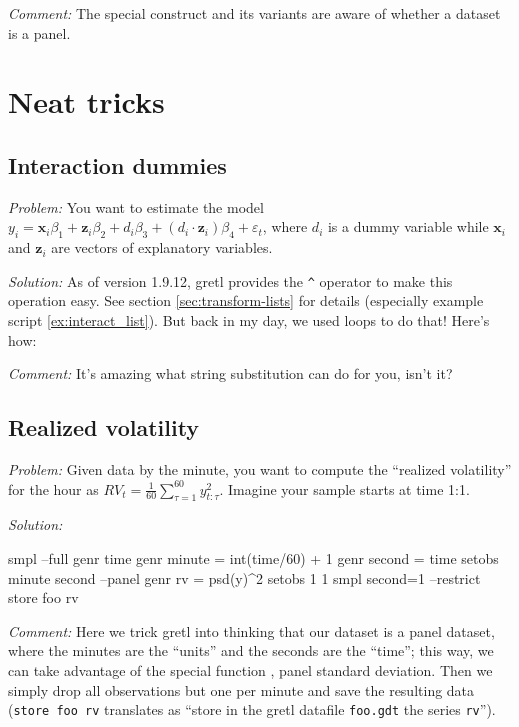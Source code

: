 \emph{Comment:} The special construct  and its variants
are aware of whether a dataset is a panel.

\section{Neat tricks}
\label{sec:cheat-neat}

\subsection{Interaction dummies}

\emph{Problem:} You want to estimate the model $y_i = \mathbf{x}_i
\beta_1 + \mathbf{z}_i \beta_2 + d_i \beta_3 + (d_i \cdot \mathbf{z}_i)
\beta_4 + \varepsilon_t$, where $d_i$ is a dummy variable while
$\mathbf{x}_i$ and $\mathbf{z}_i$ are vectors of explanatory
variables.

\emph{Solution:} As of version 1.9.12, gretl provides the
\verb|^| operator to make this operation easy. See section
\ref{sec:transform-lists} for details (especially example script
\ref{ex:interact_list}). But back in my day, we used loops to do that!
Here's how:


\emph{Comment:} It's amazing what string substitution can do for
you, isn't it?

\subsection{Realized volatility}

\emph{Problem:} Given data by the minute, you want to compute the
``realized volatility'' for the hour as $RV_t = 
\sum_{}^{60} y_{t:\tau}^2$. Imagine your sample starts at time 1:1.

\emph{Solution:}
\begin{code}
smpl --full
genr time
genr minute = int(time/60) + 1
genr second = time %
setobs minute second --panel
genr rv = psd(y)^2
setobs 1 1
smpl second=1 --restrict
store foo rv
\end{code}

\emph{Comment:} Here we trick gretl into thinking that our
dataset is a panel dataset, where the minutes are the ``units'' and
the seconds are the ``time''; this way, we can take advantage of the
special function , panel standard deviation.  Then we
simply drop all observations but one per minute and save the resulting
data (\texttt{store foo rv} translates as ``store in the gretl
datafile \texttt{foo.gdt} the series \texttt{rv}'').

